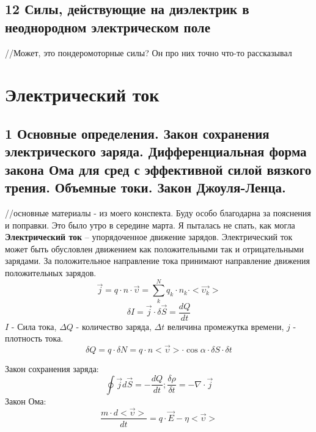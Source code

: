 \documentclass[a4paper,12pt]{article}
\begin{document}
\subsection{12   Силы, действующие на диэлектрик в неоднородном электрическом поле}
//Может, это пондеромоторные силы? Он про них точно что-то рассказывал


\section{Электрический ток}
\subsection{1   Основные определения. Закон сохранения электрического заряда. Дифференциальная форма закона Ома для сред с эффективной силой вязкого трения. Объемные токи. Закон Джоуля-Ленца.}
//основные материалы - из моего конспекта. Буду особо благодарна за пояснения и поправки. Это было утро в середине марта. Я пыталась не спать, как могла\\
\textbf{Электрический ток} – упорядоченное движение зарядов. Электрический ток может быть обусловлен движением как положительными так и отрицательными зарядами. За положительное направление тока принимают направление движения положительных зарядов.\\
\begin{equation}
	\vec{j} = q \cdot n \cdot \vec{\upsilon} = \sum _k ^N q_k \cdot n_k \cdot <\vec{\upsilon _k}> 
\end{equation}
\begin{equation}
	\delta I = \vec{j} \cdot \delta \vec{S} = \frac{dQ}{dt}
\end{equation}
$I$ - Сила тока, $\Delta Q$ - количество заряда, $\Delta t$ величина промежутка времени, $j$ - плотность тока.\\
\begin{equation}
	\delta Q = q \cdot \delta N = q \cdot n <\vec{\upsilon}> \cdot \cos{\alpha} \cdot \delta S \cdot \delta t
\end{equation}

Закон сохранения заряда:\\
\begin{equation}
	\oint \vec{j} d \vec{S} = - \frac{dQ}{dt}; \frac{\delta \rho}{\delta t} = - \nabla \cdot \vec{j} 
\end{equation}
Закон Ома:\\
\begin{equation}
	\frac{m \cdot d<\vec{\upsilon}>}{dt} = q \cdot \vec{E} - \eta <\vec{\upsilon}>
\end{equation}
\end{document}
